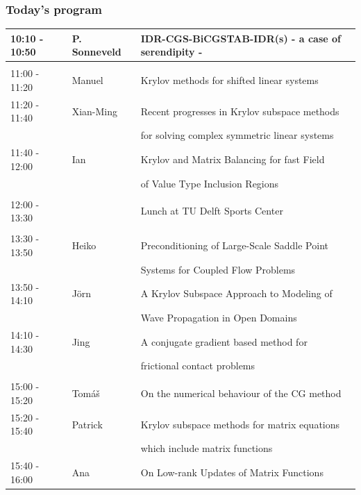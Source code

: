 \documentclass{beamer}
\begin{document}
\begin{frame}
\frametitle{Today's program}
\vspace{-0.2cm}
\tiny
\begin{table}[h]
\begin{tabular}{lll}
10:10 - 10:50 & P. Sonneveld & IDR-CGS-BiCGSTAB-IDR(s) - a case of serendipity -\\ [0.5ex]
\hline \\ [-1.5ex]
11:00 - 11:20 & Manuel & Krylov methods for shifted linear systems \\ [0.5ex]
11:20 - 11:40 & Xian-Ming & Recent progresses in Krylov subspace methods\\ 
                        & & for solving complex symmetric linear systems\\  [0.5ex]
11:40 - 12:00 & Ian & Krylov and Matrix Balancing for fast Field \\ 
              &     & of Value Type Inclusion Regions\\  [0.5ex]
\hline \\ [-1.5ex]
{\color{red}12:00 - 13:30} & & Lunch at TU Delft Sports Center \\ [0.5ex]
\hline \\ [-1.5ex]
13:30 - 13:50 & Heiko & Preconditioning of Large-Scale Saddle Point \\
                    & & Systems for Coupled Flow Problems\\ [0.5ex]
13:50 - 14:10 &J\"orn & A Krylov Subspace Approach to Modeling of \\
                     & & Wave Propagation in Open Domains\\ [0.5ex]
14:10 - {\color{red}14:30} & Jing & A conjugate gradient based method for \\
                   & & frictional contact problems\\ [0.5ex]
\hline \\ [-1.5ex]
{\color{red}15:00} - 15:20 & Tom{\'a}{\v s} & On the numerical behaviour of the CG method\\ [0.5ex]
15:20 - 15:40 & Patrick & Krylov subspace methods for matrix equations \\
                  & & which include matrix functions\\ [0.5ex]
15:40 - {\color{red}16:00} & Ana & On Low-rank Updates of Matrix Functions\\ [0.5ex]

\end{tabular}
\end{table}
\end{frame}
\end{document}

